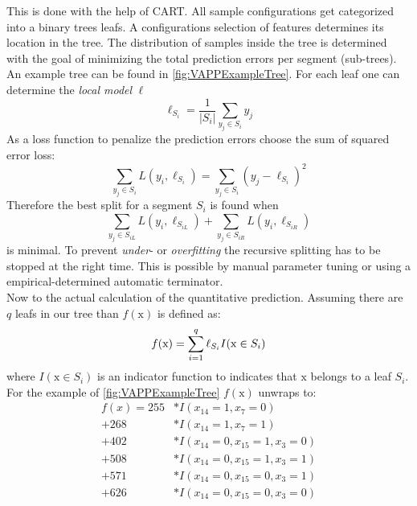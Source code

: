 This is done with the help of CART. All sample configurations get categorized into a binary trees leafs. A configurations selection of features determines its location in the tree. The distribution of samples inside the tree is determined with the goal of minimizing the total prediction errors per segment (sub-trees). An example tree can be found in \cref{fig:VAPPExampleTree}.
For each leaf one can determine the \textit{local model} $\ell$
\begin{equation}
	\ell_{S_i} = \frac{1}{|S_i|} \sum_{y_j \in S_i} y_j
\end{equation}
As a loss function to penalize the prediction errors \citet{VariabilityAwarePerformancePredictionJianmeiSigmundApel} choose the sum of squared error loss:
\begin{equation}
	\sum_{y_j \in S_i} L(y_i,\ell_{S_i}) = \sum_{y_j \in S_i} (y_j - \ell_{S_i})^2
\end{equation}
Therefore the best split for a segment $S_i$ is found when
\begin{equation*}
\sum_{y_j \in S_{iL}} L(y_i,\ell_{S_{iL}}) + \sum_{y_j \in S_{iR}} L(y_i,\ell_{S_{iR}})
\end{equation*}
is minimal. To prevent \textit{under}- or \textit{overfitting}\cite{ElementsOfStatisticalLearning} the recursive splitting has to be stopped at the right time. This is possible by manual parameter tuning or using a empirical-determined automatic terminator. \\
Now to the actual calculation of the quantitative prediction. Assuming there are $q$ leafs in our tree than $f(\mathrm{x})$ is defined as:
\begin{equation}\textsl{}
f(\mathrm{x})=\sum_{i=1}^{q} \ell_{S_i}I(\mathrm{x}\in S_i)
\end{equation}
where $I(\mathrm{x}\in S_i)$ is an indicator function to indicates that $\mathrm{x}$ belongs to a leaf $S_i$.\\
For the example of \autoref{fig:VAPPExampleTree} $f(\mathrm{x})$ unwraps to:
\begin{align*}
f(x) = 255&* I(x_{14}=1,x_7=0)\\[-0.1cm]
	 + 268&* I(x_{14}=1,x_7=1)\\[-0.1cm]
	 + 402&* I(x_{14}=0,x_{15}=1,x_3=0)\\[-0.1cm]
	 + 508&* I(x_{14}=0,x_{15}=1,x_3=1)\\[-0.1cm]
	 + 571&* I(x_{14}=0,x_{15}=0,x_3=1)\\[-0.1cm]
	 + 626&* I(x_{14}=0,x_{15}=0,x_3=0)
\end{align*}
